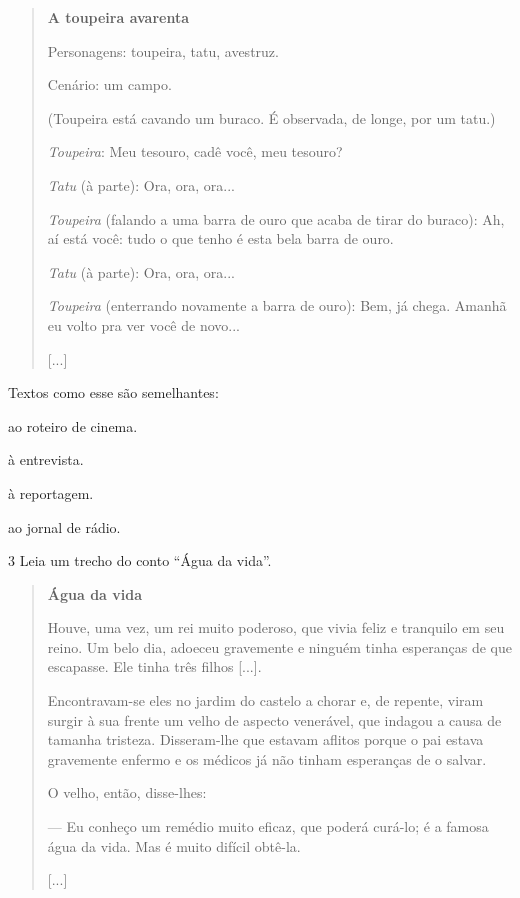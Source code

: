 \begin{quote}
\textbf{A toupeira avarenta}

Personagens: toupeira, tatu, avestruz.

Cenário: um campo.

(Toupeira está cavando um buraco. É observada, de longe, por um tatu.)

\emph{Toupeira}: Meu tesouro, cadê você, meu tesouro?

\emph{Tatu} (à parte): Ora, ora, ora...

\emph{Toupeira} (falando a uma barra de ouro que acaba de tirar do
buraco): Ah, aí está você: tudo o que tenho é esta bela barra de ouro.

\emph{Tatu} (à parte): Ora, ora, ora...

\emph{Toupeira} (enterrando novamente a barra de ouro): Bem, já chega.
Amanhã eu volto pra ver você de novo...

{[}...{]}

\end{quote}

Textos como esse são semelhantes:

\begin{escolha}
\item ao roteiro de cinema.

\item à entrevista.

\item à reportagem.

\item ao jornal de rádio.
\end{escolha}

\pagebreak
\num{3} Leia um trecho do conto ``Água da vida''.

\begin{quote}
\textbf{Água da vida}

Houve, uma vez, um rei muito poderoso, que vivia feliz e tranquilo em
seu reino. Um belo dia, adoeceu gravemente e ninguém tinha esperanças de
que escapasse. Ele tinha três filhos {[}...{]}.

Encontravam-se eles no jardim do castelo a chorar e, de repente, viram
surgir à sua frente um velho de aspecto venerável, que indagou a causa
de tamanha tristeza. Disseram-lhe que estavam aflitos porque o pai
estava gravemente enfermo e os médicos já não tinham esperanças de o
salvar.

O velho, então, disse-lhes:

--- Eu conheço um remédio muito eficaz, que poderá curá-lo; é a famosa
água da vida. Mas é muito difícil obtê-la.

{[}...{]}

\end{quote}

